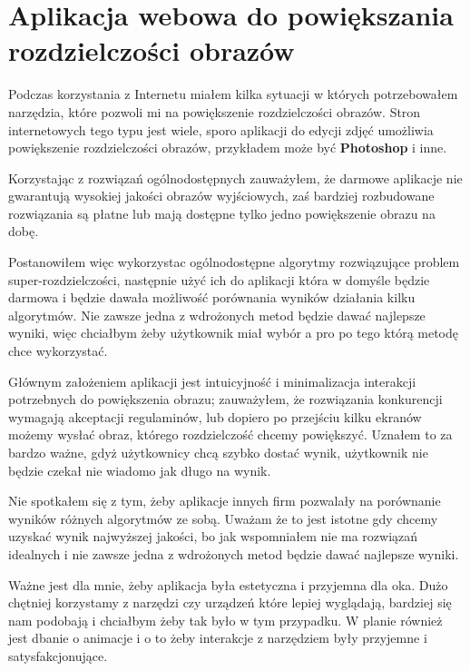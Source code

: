 \chapter{Aplikacja webowa do powiększania rozdzielczości obrazów}

Podczas korzystania z Internetu miałem kilka sytuacji w których potrzebowałem narzędzia, które pozwoli mi na powiększenie rozdzielczości obrazów. Stron internetowych tego typu jest wiele, sporo aplikacji do edycji zdjęć umożliwia powiększenie rozdzielczości obrazów, przykładem może być \textbf{Photoshop} i inne.

Korzystając z rozwiązań ogólnodostępnych zauważyłem, że darmowe aplikacje nie gwarantują wysokiej jakości obrazów wyjściowych, zaś bardziej rozbudowane rozwiązania są płatne lub mają dostępne tylko jedno powiększenie obrazu na dobę. 

Postanowiłem więc wykorzystac ogólnodostępne algorytmy rozwiązujące problem super-rozdzielczości, następnie użyć ich do aplikacji która w domyśle będzie darmowa i będzie dawała możliwość porównania wyników działania kilku algorytmów. Nie zawsze jedna z wdrożonych metod będzie dawać najlepsze wyniki, więc chciałbym żeby użytkownik miał wybór a pro po tego którą metodę chce wykorzystać.

Głównym założeniem aplikacji jest intuicyjność i minimalizacja interakcji potrzebnych do powiększenia obrazu; zauważyłem, że rozwiązania konkurencji wymagają akceptacji regulaminów, lub dopiero po przejściu kilku ekranów możemy wysłać obraz, którego rozdzielczość chcemy powiększyć. Uznałem to za bardzo ważne, gdyż użytkownicy chcą szybko dostać wynik, użytkownik nie będzie czekał nie wiadomo jak długo na wynik.

Nie spotkałem się z tym, żeby aplikacje innych firm pozwalały na porównanie wyników różnych algorytmów ze sobą. Uważam że to jest istotne gdy chcemy uzyskać wynik najwyższej jakości, bo jak wspomniałem nie ma rozwiązań idealnych i nie zawsze jedna z wdrożonych metod będzie dawać najlepsze wyniki.

Ważne jest dla mnie, żeby aplikacja była estetyczna i przyjemna dla oka. Dużo chętniej korzystamy z narzędzi czy urządzeń które lepiej wyglądają, bardziej się nam podobają i chciałbym żeby tak było w tym przypadku. W planie również jest dbanie o animacje i o to żeby interakcje z narzędziem były przyjemne i satysfakcjonujące.

